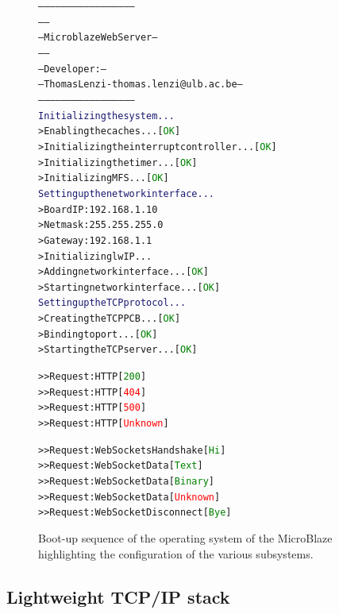     \begin{figure}[p!]
\begin{alltt}
--------------------------------------------------
--                                              --
--            Microblaze Web Server             --
--                                              --
--    Developer:                                --
--    Thomas Lenzi - thomas.lenzi@ulb.ac.be     --
--------------------------------------------------
\textcolor{MidnightBlue}{Initializing the system...}
> Enabling the caches...                     [\textcolor{Green}{OK}]
> Initializing the interrupt controller...   [\textcolor{Green}{OK}]
> Initializing the timer...                  [\textcolor{Green}{OK}]
> Initializing MFS...                        [\textcolor{Green}{OK}]
\textcolor{MidnightBlue}{Setting up the network interface...}
> Board IP: 192.168.1.10
> Netmask : 255.255.255.0
> Gateway : 192.168.1.1
> Initializing lwIP...
> Adding network interface...                [\textcolor{Green}{OK}]
> Starting network interface...              [\textcolor{Green}{OK}]
\textcolor{MidnightBlue}{Setting up the TCP protocol...}
> Creating the TCP PCB...                    [\textcolor{Green}{OK}]
> Binding to port...                         [\textcolor{Green}{OK}]
> Starting the TCP server...                 [\textcolor{Green}{OK}]

>> Request: HTTP                             [\textcolor{Green}{200}]
>> Request: HTTP                             [\textcolor{Red}{404}]
>> Request: HTTP                             [\textcolor{Red}{500}]
>> Request: HTTP                             [\textcolor{Red}{Unknown}]

>> Request: WebSockets Handshake             [\textcolor{Green}{Hi}]
>> Request: WebSocket Data                   [\textcolor{Green}{Text}]
>> Request: WebSocket Data                   [\textcolor{Green}{Binary}]
>> Request: WebSocket Data                   [\textcolor{Red}{Unknown}]
>> Request: WebSocket Disconnect             [\textcolor{Green}{Bye}]
\end{alltt}
      \caption{Boot-up sequence of the operating system of the MicroBlaze highlighting the configuration of the various subsystems.}
      \label{fig:III-2-Microblaze}
    \end{figure}

    \subsection{Lightweight TCP/IP stack}

